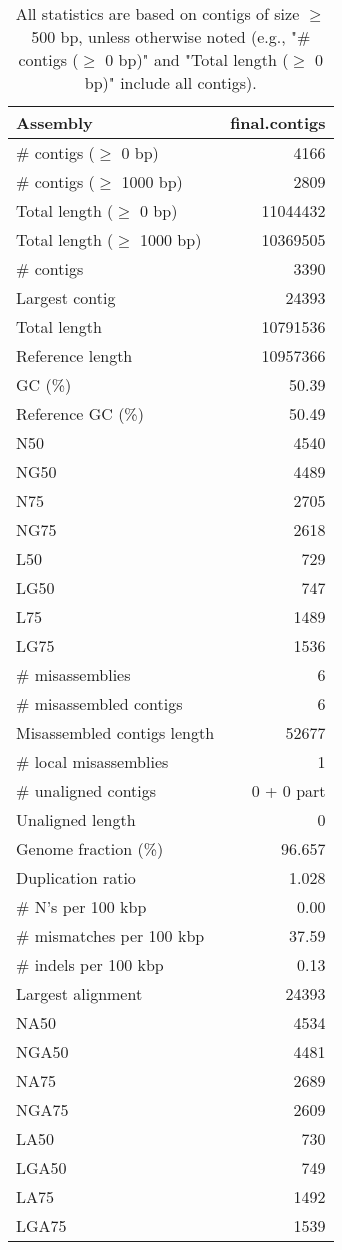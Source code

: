 \documentclass[12pt,a4paper]{article}
\begin{document}
\begin{table}[ht]
\begin{center}
\caption{All statistics are based on contigs of size $\geq$ 500 bp, unless otherwise noted (e.g., "\# contigs ($\geq$ 0 bp)" and "Total length ($\geq$ 0 bp)" include all contigs).}
\begin{tabular}{|l*{1}{|r}|}
\hline
Assembly & final.contigs \\ \hline
\# contigs ($\geq$ 0 bp) & 4166 \\ \hline
\# contigs ($\geq$ 1000 bp) & 2809 \\ \hline
Total length ($\geq$ 0 bp) & 11044432 \\ \hline
Total length ($\geq$ 1000 bp) & 10369505 \\ \hline
\# contigs & 3390 \\ \hline
Largest contig & 24393 \\ \hline
Total length & 10791536 \\ \hline
Reference length & 10957366 \\ \hline
GC (\%) & 50.39 \\ \hline
Reference GC (\%) & 50.49 \\ \hline
N50 & 4540 \\ \hline
NG50 & 4489 \\ \hline
N75 & 2705 \\ \hline
NG75 & 2618 \\ \hline
L50 & 729 \\ \hline
LG50 & 747 \\ \hline
L75 & 1489 \\ \hline
LG75 & 1536 \\ \hline
\# misassemblies & 6 \\ \hline
\# misassembled contigs & 6 \\ \hline
Misassembled contigs length & 52677 \\ \hline
\# local misassemblies & 1 \\ \hline
\# unaligned contigs & 0 + 0 part \\ \hline
Unaligned length & 0 \\ \hline
Genome fraction (\%) & 96.657 \\ \hline
Duplication ratio & 1.028 \\ \hline
\# N's per 100 kbp & 0.00 \\ \hline
\# mismatches per 100 kbp & 37.59 \\ \hline
\# indels per 100 kbp & 0.13 \\ \hline
Largest alignment & 24393 \\ \hline
NA50 & 4534 \\ \hline
NGA50 & 4481 \\ \hline
NA75 & 2689 \\ \hline
NGA75 & 2609 \\ \hline
LA50 & 730 \\ \hline
LGA50 & 749 \\ \hline
LA75 & 1492 \\ \hline
LGA75 & 1539 \\ \hline
\end{tabular}
\end{center}
\end{table}
\end{document}
